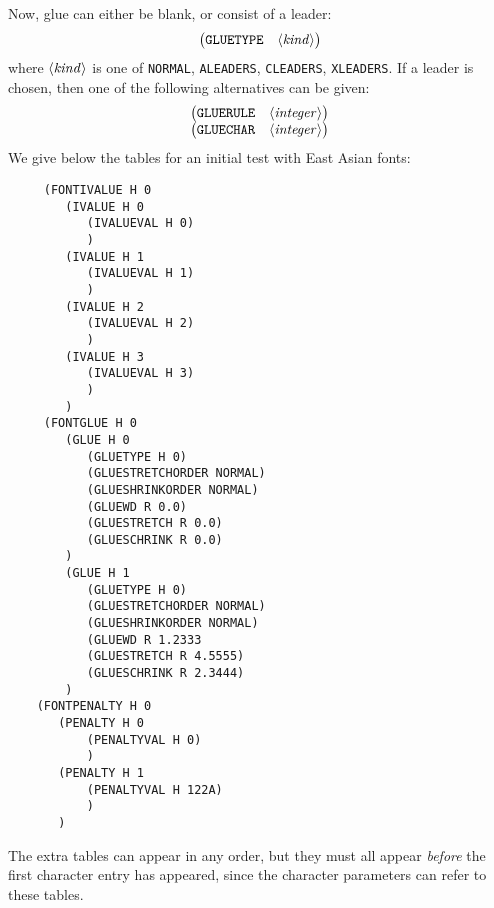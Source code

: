 \documentclass[fleqn]{article}
\newcommand{\showinteger}{\langle\mbox{\emph{integer}}\rangle}
\newcommand{\showkind}{\langle\mbox{\emph{kind}}\rangle}
\begin{document}
Now, glue can either be blank, or consist of a leader:
\[
\begin{array}{ll}
     \bigl(\texttt{GLUETYPE} & \showkind\bigr)\\
\end{array}
\]
where $\showkind$ is one of \texttt{NORMAL}, \texttt{ALEADERS},
\texttt{CLEADERS}, \texttt{XLEADERS}.  If a leader is chosen,
then one of the following alternatives can be given:
\[
\begin{array}{ll}
     \bigl(\texttt{GLUERULE} & \showinteger\bigr)\\
     \bigl(\texttt{GLUECHAR} & \showinteger\bigr)\\
\end{array}
\]
We give below the tables for an initial test with East Asian fonts:
\begin{verbatim}
     (FONTIVALUE H 0
        (IVALUE H 0
           (IVALUEVAL H 0)
           )
        (IVALUE H 1
           (IVALUEVAL H 1)
           )
        (IVALUE H 2
           (IVALUEVAL H 2)
           )
        (IVALUE H 3
           (IVALUEVAL H 3)
           )
        )
     (FONTGLUE H 0
        (GLUE H 0
           (GLUETYPE H 0)
           (GLUESTRETCHORDER NORMAL)
           (GLUESHRINKORDER NORMAL)
           (GLUEWD R 0.0)
           (GLUESTRETCH R 0.0)
           (GLUESCHRINK R 0.0)
        )
        (GLUE H 1
           (GLUETYPE H 0)
           (GLUESTRETCHORDER NORMAL)
           (GLUESHRINKORDER NORMAL)
           (GLUEWD R 1.2333
           (GLUESTRETCH R 4.5555)
           (GLUESCHRINK R 2.3444)
        )
    (FONTPENALTY H 0
       (PENALTY H 0
           (PENALTYVAL H 0)
           )
       (PENALTY H 1
           (PENALTYVAL H 122A)
           )
       )
\end{verbatim}

The extra tables can appear in any order, but they must all appear
\emph{before} the first character entry has appeared, since the
character parameters can refer to these tables.
\end{document}
